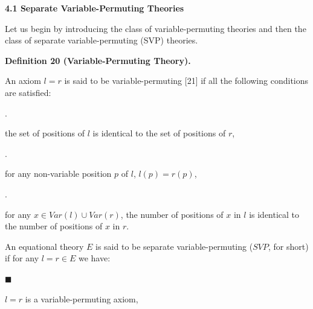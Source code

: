 \par\medskip\noindent\textbf{4.1 Separate Variable-Permuting Theories}\par
 
 
Let us begin by introducing the class of variable-permuting theories and then the class of separate variable-permuting (SVP) theories.\par
 
 
 
\par\medskip\noindent\textbf{Definition 20 (Variable-Permuting Theory).}\par
 
 
An axiom $l=r$ is said to be variable-permuting [21] if all the following conditions are satisfied:\par
  
\par{}. 
 
the set of positions of $l$ is identical to the set of positions of $r$,\par
 
 
 
\par{}. 
 
for any non-variable position $p$ of $l$, $l(p)=r(p)$,\par
 
 
 
\par{}. 
 
for any $x\in\mathit{Var}(l)\cup\mathit{Var}(r)$, the number of positions of $x$ in $l$ is identical to the number of positions of $x$ in $r$.\par
 
 
  
An equational theory $E$ is said to be separate variable-permuting ($\mathit{SVP}$, for short) if for any $l=r\in E$ we have:\par
  
\par\noindent  $\blacksquare$ 
 
$l=r$ is a variable-permuting axiom,\par
 
 
